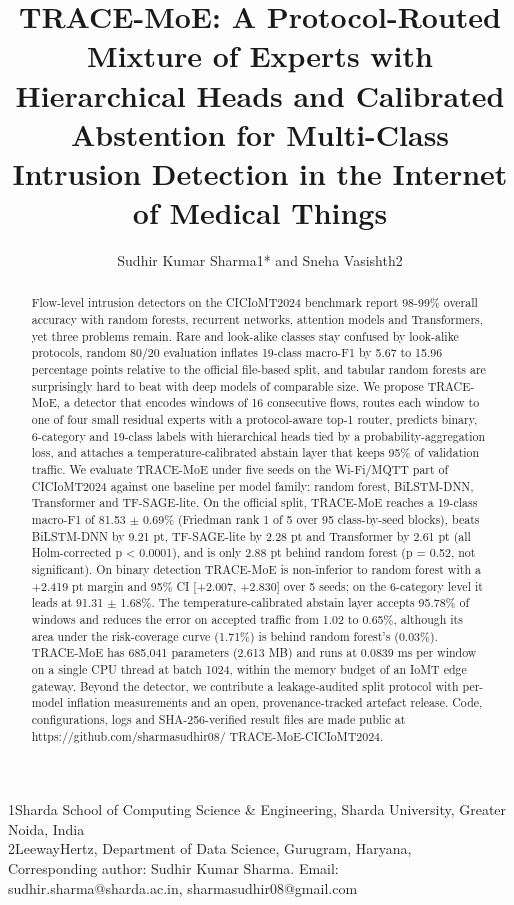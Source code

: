\documentclass[11pt]{article}
\title{TRACE-MoE: A Protocol-Routed Mixture of Experts with Hierarchical Heads and Calibrated Abstention for Multi-Class Intrusion Detection in the Internet of Medical Things}
\author{Sudhir Kumar Sharma1* and Sneha Vasishth2}
\date{}
\begin{document}
\maketitle

\noindent 1Sharda School of Computing Science \& Engineering, Sharda University, Greater Noida, India \\
2LeewayHertz, Department of Data Science,  Gurugram, Haryana, \\
Corresponding author: Sudhir Kumar Sharma. Email: sudhir.sharma@sharda.ac.in, sharmasudhir08@gmail.com

\begin{abstract}
Flow-level intrusion detectors on the CICIoMT2024 benchmark report 98-99\% overall accuracy with random forests, recurrent networks, attention models and Transformers, yet three problems remain. Rare and look-alike classes stay confused by look-alike protocols, random 80/20 evaluation inflates 19-class macro-F1 by 5.67 to 15.96 percentage points relative to the official file-based split, and tabular random forests are surprisingly hard to beat with deep models of comparable size. We propose TRACE-MoE, a detector that encodes windows of 16 consecutive flows, routes each window to one of four small residual experts with a protocol-aware top-1 router, predicts binary, 6-category and 19-class labels with hierarchical heads tied by a probability-aggregation loss, and attaches a temperature-calibrated abstain layer that keeps 95\% of validation traffic. We evaluate TRACE-MoE under five seeds on the Wi-Fi/MQTT part of CICIoMT2024 against one baseline per model family: random forest, BiLSTM-DNN, Transformer and TF-SAGE-lite. On the official split, TRACE-MoE reaches a 19-class macro-F1 of 81.53 $\pm$ 0.69\% (Friedman rank 1 of 5 over 95 class-by-seed blocks), beats BiLSTM-DNN by 9.21 pt, TF-SAGE-lite by 2.28 pt and Transformer by 2.61 pt (all Holm-corrected p < 0.0001), and is only 2.88 pt behind random forest (p = 0.52, not significant). On binary detection TRACE-MoE is non-inferior to random forest with a +2.419 pt margin and 95\% CI [+2.007, +2.830] over 5 seeds; on the 6-category level it leads at 91.31 $\pm$ 1.68\%. The temperature-calibrated abstain layer accepts 95.78\% of windows and reduces the error on accepted traffic from 1.02 to 0.65\%, although its area under the risk-coverage curve (1.71\%) is behind random forest's (0.03\%). TRACE-MoE has 685,041 parameters (2.613 MB) and runs at 0.0839 ms per window on a single CPU thread at batch 1024, within the memory budget of an IoMT edge gateway. Beyond the detector, we contribute a leakage-audited split protocol with per-model inflation measurements and an open, provenance-tracked artefact release. Code, configurations, logs and SHA-256-verified result files are made public at https://github.com/sharmasudhir08/ TRACE-MoE-CICIoMT2024.
\end{abstract}
\end{document}
